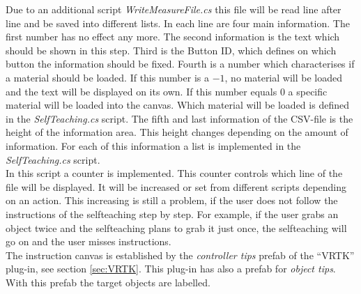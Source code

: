 Due to an additional script \textit{WriteMeasureFile.cs} this file will be read line after line and be saved into different lists. In each line are four main information. The first number has no effect any more. The second information is the text which should be shown in this step. Third is the Button ID, which defines on which button the information should be fixed. Fourth is a number which characterises if a material should be loaded. If this number is a $-1$, no material will be loaded and the text will be displayed on its own. If this number equals $0$ a specific material will be loaded into the canvas. Which material will be loaded is defined in the \textit{SelfTeaching.cs }script. The fifth and last information of the CSV-file is the height of the information area. This height changes depending on the amount of information. For each of this information a list is implemented in the \textit{SelfTeaching.cs} script.\\
In this script a counter is implemented. This counter controls which line of the file will be displayed. It will be increased or set from different scripts depending on an action. This increasing is still a problem, if the user does not follow the instructions of the selfteaching step by step. For example, if the user grabs an object twice and the selfteaching plans to grab it just once, the selfteaching will go on and the user misses instructions. \\
The instruction canvas is established by the \textit{controller tips} prefab of the ``VRTK'' plug-in, see section \ref{sec:VRTK}. This plug-in has also a prefab for \textit{object tips}. With this prefab the target objects are labelled.


\newpage